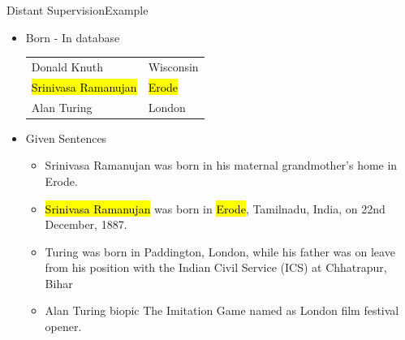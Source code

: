 \documentclass{beamer}
\makeatletter
\newcommand\SoulColor{%
  \let\set@color\beamerorig@set@color
  \let\reset@color\beamerorig@reset@color}
\makeatother
\begin{document}
\begin{frame}{Distant Supervision}{Example}
\begin{itemize}
 
\item Born - In database
 \begin{center}
\begin{tabular}{|l|l|}
\hline
Donald Knuth & Wisconsin \\
\SoulColor\hl{Srinivasa Ramanujan} & \SoulColor\hl{Erode} \\
Alan Turing & London \\
\hline
\end{tabular}
\end{center}
\item Given Sentences
\begin{itemize}
\item Srinivasa Ramanujan was born in his maternal grandmother’s home in Erode.
\item \alert<+> {\SoulColor\hl{Srinivasa Ramanujan} was born in \SoulColor\hl{Erode}, Tamilnadu, India, on 22nd December, 1887.}
\item Turing was born in Paddington, London, while his father was on leave from his position with the Indian Civil Service (ICS) at Chhatrapur, Bihar
\item Alan Turing biopic The Imitation Game named as London film festival opener.
\end{itemize}
\end{itemize}
 
\end{frame}
\end{document}
